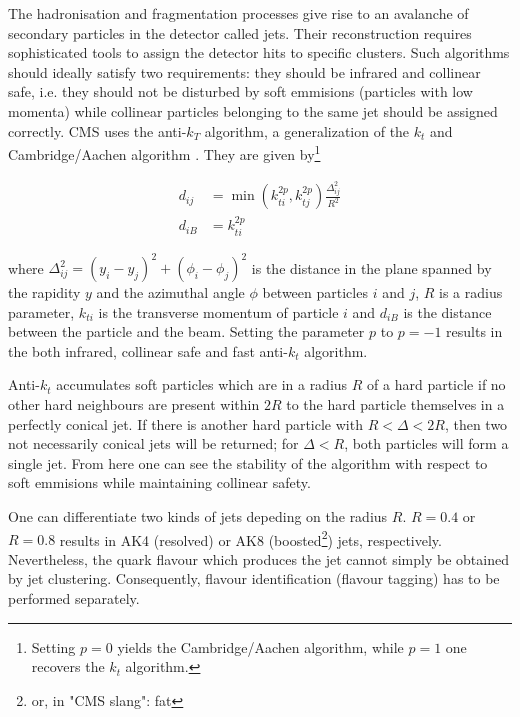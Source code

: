
The hadronisation and fragmentation processes give rise to an avalanche of secondary particles in the detector called jets. Their reconstruction requires sophisticated tools to assign the detector hits to specific clusters. Such algorithms should ideally satisfy two requirements: they should be infrared and collinear safe, i.e. they should not be disturbed by soft emmisions (particles with low momenta) while collinear particles belonging to the same jet should be assigned correctly. CMS uses the anti-$k_T$ algorithm, a generalization of the $k_t$ and Cambridge/Aachen algorithm \cite{Cacciari_2008}. They are given by\footnote{Setting $p=0$ yields the Cambridge/Aachen algorithm, while $p=1$ one recovers the $k_t$ algorithm.}

\begin{equation*}
	\begin{aligned}
		d_{ij} &= \min\left(k^{2p}_{ti}, k^{2p}_{tj}\right)\frac{\Delta^2_{ij}}{R^2} \\
		d_{iB} &= k^{2p}_{ti}
	\end{aligned}
\end{equation*}

where $\Delta^2_{ij} = (y_i-y_j)^2 + (\phi_i - \phi_j)^2$ is the distance in the plane spanned by the rapidity $y$ and the azimuthal angle $\phi$ between particles $i$ and $j$, $R$ is a radius parameter, $k_{ti}$ is the transverse momentum of particle $i$ and $d_{iB}$ is the distance between the particle and the beam. Setting the parameter $p$ to $p=-1$ results in the both infrared, collinear safe and fast anti-$k_t$ algorithm.

Anti-$k_t$ accumulates soft particles which are in a radius $R$ of a hard particle if no other hard neighbours are present within $2R$  to the hard particle themselves in a perfectly conical jet. If there is another hard particle with $R < \Delta<2R$, then two not necessarily conical jets will be returned; for $\Delta<R$, both particles will form a single jet. From here one can see the stability of the algorithm with respect to soft emmisions while maintaining collinear safety.

One can differentiate two kinds of jets depeding on the radius $R$. $R=0.4$ or $R=0.8$ results in AK4 (resolved) or AK8 (boosted\footnote{or, in "CMS slang": fat}) jets, respectively. Nevertheless, the quark flavour which produces the jet cannot simply be obtained by jet clustering. Consequently, flavour identification (flavour tagging) has to be performed separately.

